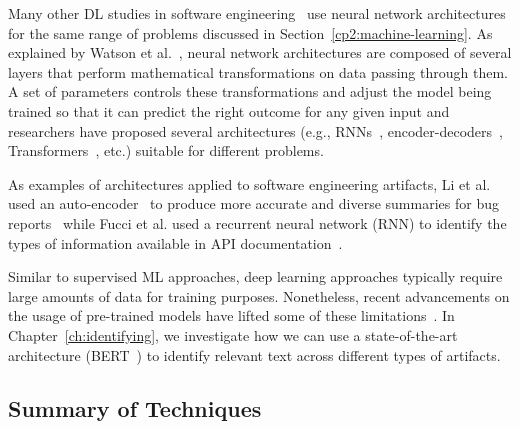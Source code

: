 Many other \acs{DL} studies in software engineering~\cite{ferreira2021,li2018deep}
use neural network architectures 
for the same range of problems discussed in Section~\ref{cp2:machine-learning}.
As explained by Watson et al.~\cite{watson2022},
neural network architectures are composed of several layers 
that perform mathematical transformations on data passing through them. 
A set of parameters controls these transformations and 
adjust the model being trained so that it can predict 
the right outcome for any given input
and researchers have proposed 
several architectures (e.g., \acs{RNN}s~\cite{rumelhart1986rnn, sutskever2014seq2seq}, encoder-decoders~\cite{bahdanau2014neural}, Transformers~\cite{Vaswani2017attention}, etc.) 
suitable for different problems. 



As examples of architectures applied to software engineering  artifacts,
Li et al. used an auto-encoder~\cite{liou2014autoencoder}
to produce more accurate and diverse summaries 
for bug reports~\cite{li2018deep} while 
Fucci et al. used a 
recurrent neural network (\acs{RNN}) 
to identify the types of information available in 
API documentation~\cite{fucci2019}.



Similar to supervised \acs{ML} approaches, deep learning approaches 
typically require large amounts of data for training purposes.
Nonetheless, recent advancements on the usage of
pre-trained models 
have lifted some of these limitations~\cite{erhan2010pre-train}.
In Chapter~\ref{ch:identifying},
we investigate how we can use a state-of-the-art architecture (BERT~\cite{Devlin2018Bert}) 
to identify relevant text across different types of artifacts.




\subsection{Summary of Techniques}













